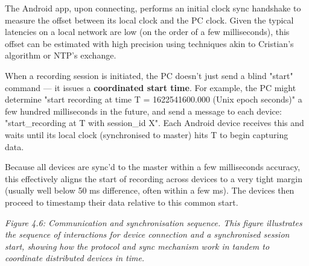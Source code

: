 The Android app, upon connecting, performs an initial clock sync handshake to measure the offset between its local clock and the PC clock. Given the typical latencies on a local network are low (on the order of a few milliseconds), this offset can be estimated with high precision using techniques akin to Cristian's algorithm or NTP's exchange.

When a recording session is initiated, the PC doesn't just send a blind "start" command — it issues a \textbf{coordinated start time}. For example, the PC might determine "start recording at time T = 1622541600.000 (Unix epoch seconds)" a few hundred milliseconds in the future, and send a message to each device: "start\_recording at T with session\_id X". Each Android device receives this and waits until its local clock (synchronised to master) hits T to begin capturing data.

Because all devices are sync'd to the master within a few milliseconds accuracy, this effectively aligns the start of recording across devices to a very tight margin (usually well below 50 ms difference, often within a few ms). The devices then proceed to timestamp their data relative to this common start.

\textit{Figure 4.6: Communication and synchronisation sequence. This figure illustrates the sequence of interactions for device connection and a synchronised session start, showing how the protocol and sync mechanism work in tandem to coordinate distributed devices in time.}
